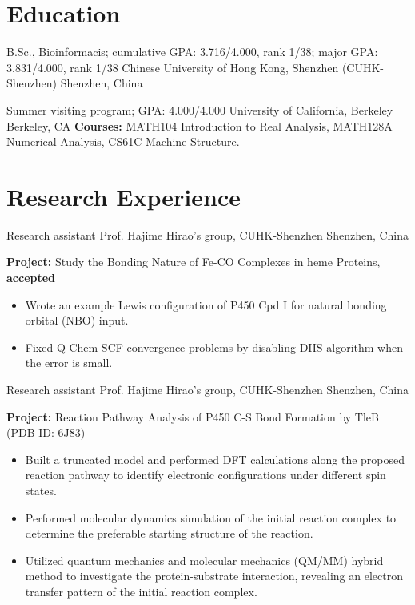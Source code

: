 \documentclass[11pt]{moderncv}
\begin{document}
\maketitle


\vspace{-3em}

\section{Education}
{B.Sc., Bioinformacis; cumulative GPA: 3.716/4.000, rank 1/38; major GPA: 3.831/4.000, rank 1/38}
{Chinese University of Hong Kong, Shenzhen (CUHK-Shenzhen)}
{Shenzhen, China}
{}
{}

{Summer visiting program; GPA: 4.000/4.000}
{University of California, Berkeley}
{Berkeley, CA}
{}
{\textbf{Courses:} MATH104 Introduction to Real Analysis, MATH128A Numerical Analysis, CS61C Machine Structure.}


\section{Research Experience}
{Research assistant}
{Prof. Hajime Hirao's group, CUHK-Shenzhen}
{Shenzhen, China}
{}
{\textbf{Project:} Study the Bonding Nature of Fe-CO Complexes in heme Proteins, \textbf{accepted}
    \begin{itemize}\setlength\itemsep{-1pt}
        \item Wrote an example Lewis configuration of P450 Cpd I for natural bonding orbital (NBO) input.
        \item Fixed Q-Chem SCF convergence problems by disabling DIIS algorithm when the error is small.
    \end{itemize}
}

{Research assistant}
{Prof. Hajime Hirao's group, CUHK-Shenzhen}
{Shenzhen, China}
{}
{\textbf {Project:} Reaction Pathway Analysis of P450 C-S Bond Formation by TleB (PDB ID: 6J83)
    \begin{itemize}\setlength\itemsep{-1pt}
    \item Built a truncated model and performed DFT calculations along the proposed reaction pathway to identify electronic configurations under different spin states.
    \item Performed molecular dynamics simulation of the initial reaction complex to determine the preferable starting structure of the reaction.
    \item Utilized quantum mechanics and molecular mechanics (QM/MM) hybrid method to investigate the protein-substrate interaction, revealing an electron transfer pattern of the initial reaction complex.
\end{itemize}
}
\end{document}
